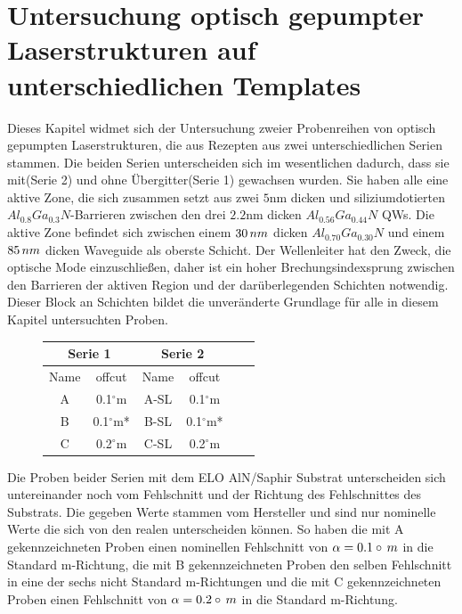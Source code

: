 
\thispagestyle{fancy}
\justifying
\section{Untersuchung optisch gepumpter Laserstrukturen auf unterschiedlichen Templates}
\label{sec:offcut}
Dieses Kapitel widmet sich der Untersuchung zweier Probenreihen von optisch gepumpten Laserstrukturen, die aus Rezepten aus zwei unterschiedlichen Serien stammen. Die beiden Serien unterscheiden sich im wesentlichen dadurch, dass sie mit(Serie 2) und ohne Übergitter(Serie 1) gewachsen wurden. Sie haben alle eine aktive Zone, die sich zusammen setzt aus zwei $5$nm dicken und siliziumdotierten $ Al_{0.8}Ga_{0.3}N$-Barrieren zwischen den drei $2.2$nm dicken $ Al_{0.56}Ga_{0.44}N$ QWs. Die aktive Zone befindet sich zwischen einem $30 \thinspace nm$ dicken $ Al_{0.70}Ga_{0.30}N$ und einem $85 \thinspace nm$ dicken Waveguide als oberste Schicht. Der Wellenleiter hat den Zweck, die optische Mode einzuschließen, daher ist ein hoher Brechungsindexsprung zwischen den Barrieren der aktiven Region und der darüberlegenden Schichten notwendig.
Dieser Block an Schichten bildet die unveränderte Grundlage für alle in diesem Kapitel untersuchten Proben.
\begin{figure}[H]
\centering
\begin{tabular}{ |c|c|c|c|c|c|   }
\hline
\multicolumn{2}{|c|}{Serie 1} & \multicolumn{2}{c|}{Serie 2}  \\
\hline
Name & offcut&  Name & offcut  \\
\hline
A & 0.1$^\circ$m  & A-SL & 0.1$^\circ$m \\
B & 0.1$^\circ$m* & B-SL & 0.1$^\circ$m* \\
C & 0.2$^\circ$m  & C-SL & 0.2$^\circ$m \\
\hline
\end{tabular}
\end{figure}
\noindent 
Die Proben beider Serien mit dem ELO AlN/Saphir Substrat unterscheiden sich untereinander noch vom Fehlschnitt und der Richtung des Fehlschnittes des Substrats. Die gegeben Werte stammen vom Hersteller und sind nur nominelle Werte die sich von den realen unterscheiden können. So haben die mit A gekennzeichneten Proben einen nominellen Fehlschnitt von $\alpha = 0.1\circ \thinspace m$ in die Standard m-Richtung, die mit B gekennzeichneten Proben den selben Fehlschnitt in eine der sechs nicht Standard m-Richtungen und die mit C gekennzeichneten Proben einen Fehlschnitt von $\alpha = 0.2\circ \thinspace m$ in die Standard m-Richtung. 
